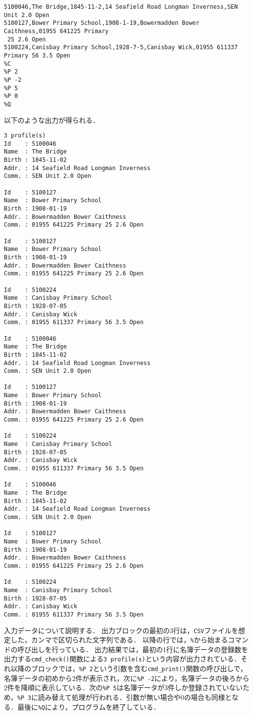 {\fontsize{10pt}{11pt} \selectfont
 \begin{verbatim}
5100046,The Bridge,1845-11-2,14 Seafield Road Longman Inverness,SEN Unit 2.0 Open
5100127,Bower Primary School,1908-1-19,Bowermadden Bower Caithness,01955 641225 Primary
 25 2.6 Open
5100224,Canisbay Primary School,1928-7-5,Canisbay Wick,01955 611337 Primary 56 3.5 Open
%C
%P 2
%P -2
%P 5
%P 0
%Q
 \end{verbatim}
}

\noindent %
以下のような出力が得られる．

{\fontsize{10pt}{11pt} \selectfont
 \begin{verbatim}
3 profile(s)
Id    : 5100046
Name  : The Bridge
Birth : 1845-11-02
Addr. : 14 Seafield Road Longman Inverness
Comm. : SEN Unit 2.0 Open

Id    : 5100127
Name  : Bower Primary School
Birth : 1908-01-19
Addr. : Bowermadden Bower Caithness
Comm. : 01955 641225 Primary 25 2.6 Open

Id    : 5100127
Name  : Bower Primary School
Birth : 1908-01-19
Addr. : Bowermadden Bower Caithness
Comm. : 01955 641225 Primary 25 2.6 Open

Id    : 5100224
Name  : Canisbay Primary School
Birth : 1928-07-05
Addr. : Canisbay Wick
Comm. : 01955 611337 Primary 56 3.5 Open

Id    : 5100046
Name  : The Bridge
Birth : 1845-11-02
Addr. : 14 Seafield Road Longman Inverness
Comm. : SEN Unit 2.0 Open

Id    : 5100127
Name  : Bower Primary School
Birth : 1908-01-19
Addr. : Bowermadden Bower Caithness
Comm. : 01955 641225 Primary 25 2.6 Open

Id    : 5100224
Name  : Canisbay Primary School
Birth : 1928-07-05
Addr. : Canisbay Wick
Comm. : 01955 611337 Primary 56 3.5 Open

Id    : 5100046
Name  : The Bridge
Birth : 1845-11-02
Addr. : 14 Seafield Road Longman Inverness
Comm. : SEN Unit 2.0 Open

Id    : 5100127
Name  : Bower Primary School
Birth : 1908-01-19
Addr. : Bowermadden Bower Caithness
Comm. : 01955 641225 Primary 25 2.6 Open

Id    : 5100224
Name  : Canisbay Primary School
Birth : 1928-07-05
Addr. : Canisbay Wick
Comm. : 01955 611337 Primary 56 3.5 Open

 \end{verbatim}
}

入力データについて説明する．
出力ブロックの最初の3行は，\verb|CSV|ファイルを想定した，カンマで区切られた文字列である．
以降の行では，\verb|%|から始まるコマンドの呼び出しを行っている．
出力結果では，最初の1行に名簿データの登録数を出力する\verb|cmd_check()|関数による\verb|3 profile(s)|という内容が出力されている．それ以降のブロックでは，\verb|%P 2|という引数を含む\verb|cmd_print()|関数の呼び出しで，名簿データの初めから2件が表示され，次に\verb|%P -2|により，名簿データの後ろから2件を降順に表示している．次の\verb|%P 5|は名簿データが3件しか登録されていないため，\verb|%P 3|に読み替えて処理が行われる．引数が無い場合や$0$の場合も同様となる．最後に\verb|%Q|により，プログラムを終了している．

